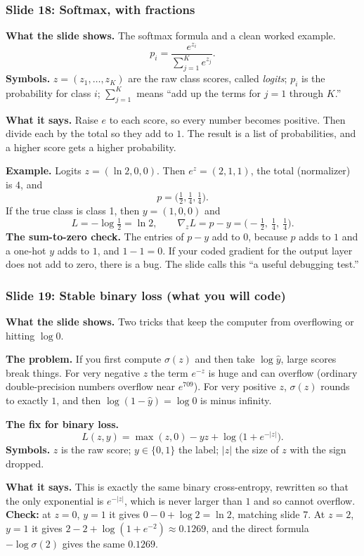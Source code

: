 \subsubsection{Slide 18: Softmax, with fractions}

\textbf{What the slide shows.} The softmax formula and a clean worked example.
\[
p_i = \frac{e^{z_i}}{\sum_{j=1}^{K} e^{z_j}}.
\]
\textbf{Symbols.} $z=(z_1,\dots,z_K)$ are the raw class scores, called \emph{logits}; $p_i$ is the probability for class $i$; $\sum_{j=1}^K$ means ``add up the terms for $j=1$ through $K$.''

\textbf{What it says.} Raise $e$ to each score, so every number becomes positive. Then divide each by the total so they add to $1$. The result is a list of probabilities, and a higher score gets a higher probability.

\textbf{Example.} Logits $z=(\ln2,0,0)$. Then $e^{z}=(2,1,1)$, the total (normalizer) is $4$, and
\[
p = \Big(\tfrac12,\tfrac14,\tfrac14\Big).
\]
If the true class is class 1, then $y=(1,0,0)$ and
\[
L = -\log\tfrac12 = \ln2, \qquad \nabla_z L = p-y = \Big(-\tfrac12,\ \tfrac14,\ \tfrac14\Big).
\]
\textbf{The sum-to-zero check.} The entries of $p-y$ add to $0$, because $p$ adds to $1$ and a one-hot $y$ adds to $1$, and $1-1=0$. If your coded gradient for the output layer does not add to zero, there is a bug. The slide calls this ``a useful debugging test.''

\subsubsection{Slide 19: Stable binary loss (what you will code)}

\textbf{What the slide shows.} Two tricks that keep the computer from overflowing or hitting $\log 0$.

\textbf{The problem.} If you first compute $\sigma(z)$ and then take $\log\hat{y}$, large scores break things. For very negative $z$ the term $e^{-z}$ is huge and can overflow (ordinary double-precision numbers overflow near $e^{709}$). For very positive $z$, $\sigma(z)$ rounds to exactly $1$, and then $\log(1-\hat{y})=\log 0$ is minus infinity.

\textbf{The fix for binary loss.}
\[
L(z,y) = \max(z,0) - yz + \log\!\big(1+e^{-|z|}\big).
\]
\textbf{Symbols.} $z$ is the raw score; $y\in\{0,1\}$ the label; $|z|$ the size of $z$ with the sign dropped.

\textbf{What it says.} This is exactly the same binary cross-entropy, rewritten so that the only exponential is $e^{-|z|}$, which is never larger than $1$ and so cannot overflow. \textbf{Check:} at $z=0$, $y=1$ it gives $0-0+\log2=\ln2$, matching slide 7. At $z=2$, $y=1$ it gives $2-2+\log(1+e^{-2})\approx0.1269$, and the direct formula $-\log\sigma(2)$ gives the same $0.1269$.

